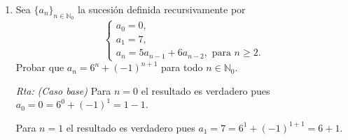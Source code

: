 \documentclass[a4paper,12pt,twoside,spanish,reqno]{amsbook}
\numberwithin{equation}{section}
\newcommand{\rta}{\noindent\textit{Rta: }}
\begin{document}
\begin{enumerate}
        \rta \textit{(Caso  base) } Para $n=0$ el resultado es verdadero pues $a_0 = 1 = 0!$.
        
        Para $n=1$ el resultado es verdadero pues $a_1 = 1 = 1!$.
        
        {\it (Paso  inductivo) } Supongamos que $k \ge 1$ y el resultado  es cierto para los $h$ tales que  $1 \le h \le k$. Es decir que $a_h = h!$ para $1 \le h \le k$ y $k \ge 1$ (hipótesis inductiva), entonces debemos probar que $a_{k+1} = (k+1)!$. Ahora bien, 
        \begin{equation*}
        \begin{matrix}\qquad\qquad
        a_{k+1} &=&  3a_{k+1-1}+(k+1-1)(k+1-3)a_{k+1-2}  \hfill &\quad \text{(por definición recursiva)} \hfill \\[4pt]
        &=&  3a_{k}+k(k-2)a_{k-1}   \hfill &\hfill\\[4pt]
        &=&  3k!+k(k-2)(k-1)!  \hfill &\quad \text{(por hipótesis inductiva})\hfill \\[4pt]
        &=&  3k!+(k-2)k! \hfill  & \hfill\\[4pt]
        &=&  (3 + k-2)k! \hfill  & \hfill\\[4pt]
        &=&  ( k+1)k! \hfill  & \hfill\\[4pt]
        &=&  (k+1)! \hfill  & \hfill\\
        \end{matrix}
        \end{equation*}

        \item Sea $\{a_n\}_{n\in\mathbb N_0}$ la sucesión definida recursivamente por
        $$\begin{cases}
        a_0=0, \\a_1=7, \\a_{n} = 5a_{n-1}+6a_{n-2}, \text{ para $n\geq 2$}.
        \end{cases}$$
        Probar que $a_n=6^n + (-1)^{n+1}$ para todo $n\in \mathbb N_0$.

        \rta \textit{(Caso  base) } Para $n=0$ el resultado es verdadero pues $a_0 = 0 = 6^0 + (-1)^{1} =1 -1$.
        
        Para $n=1$ el resultado es verdadero pues $a_1 = 7 = 6^1 + (-1)^{1+1} = 6 +1$.
        

\end{enumerate}
\end{document}
